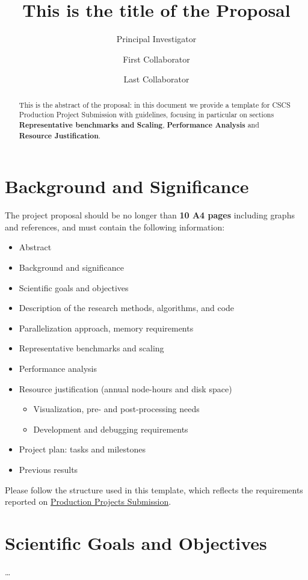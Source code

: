 \documentclass[11pt]{article}
\title{This is the title of the Proposal}
\author[1]{Principal Investigator}
\author[2]{First Collaborator}
\author[1,2]{Last Collaborator}
\affil[1]{Affiliation of the PI}
\affil[2]{Other affiliation}
\date{}
\begin{document}
\maketitle

\begin{abstract}
This is the abstract of the proposal: in this document we provide a template for 
CSCS Production Project Submission with guidelines, focusing in particular on 
sections \textbf{Representative benchmarks and Scaling}, \textbf{Performance Analysis} 
and \textbf{Resource Justification}.
\end{abstract}

\section{Background and Significance}
The project proposal should be no longer than \textbf{10 A4 pages} including graphs and references, 
and must contain the following information:
\begin{itemize}
 \item Abstract
 \item Background and significance
 \item Scientific goals and objectives
 \item Description of the research methods, algorithms, and code
 \item Parallelization approach, memory requirements
 \item Representative benchmarks and scaling
 \item Performance analysis
 \item Resource justification (annual node-hours and disk space)
 \begin{itemize}
  \item Visualization, pre- and post-processing needs
  \item Development and debugging requirements
 \end{itemize}
 \item Project plan: tasks and milestones
 \item Previous results 
\end{itemize}
Please follow the structure used in this template, which reflects the requirements reported on 
\href{http://www.cscs.ch/user_lab/allocation_schemes/submission100/index.html}{Production Projects Submission}. 

\section{Scientific Goals and Objectives}
\ldots 
\end{document}
